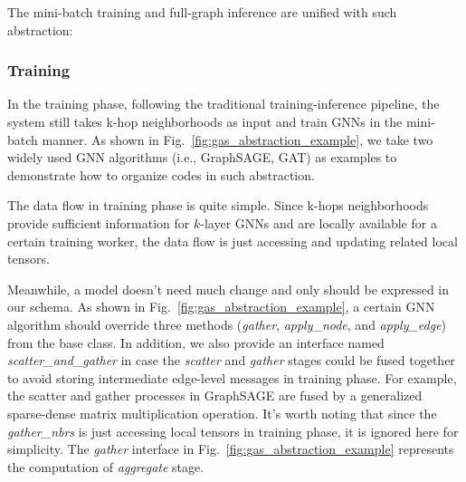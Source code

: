 \documentclass[conference]{IEEEtran}
\begin{document}
The mini-batch training and full-graph inference are unified with such abstraction:
\subsubsection{Training}
In the training phase, following the traditional training-inference pipeline, the system still takes k-hop neighborhoods as input and train GNNs in the mini-batch manner.
As shown in Fig.~\ref{fig:gas_abstraction_example}, we take two widely used GNN algorithms (i.e., GraphSAGE, GAT) as examples to demonstrate how to organize codes in such abstraction.


The data flow in training phase is quite simple.
Since k-hops neighborhoods provide sufficient information for $k$-layer GNNs\cite{b17} and are locally available for a certain training worker, the data flow is just accessing and updating related local tensors.

Meanwhile, a model doesn't need much change and only should be expressed in our schema.
As shown in Fig.~\ref{fig:gas_abstraction_example}, a certain GNN algorithm should override three methods (\emph{gather}, \emph{apply\_node}, and \emph{apply\_edge}) from the base class.
In addition, we also provide an interface named \emph{scatter\_and\_gather} in case the \emph{scatter} and \emph{gather} stages could be fused together to avoid storing intermediate edge-level messages in training phase\cite{b13}.
For example, the scatter and gather processes in GraphSAGE are fused by a generalized sparse-dense matrix multiplication operation.
It's worth noting that since the \emph{gather\_nbrs} is just accessing local tensors in training phase, it is ignored here for simplicity.
The \emph{gather} interface in Fig.~\ref{fig:gas_abstraction_example} represents the computation of \emph{aggregate} stage.
\end{document}
